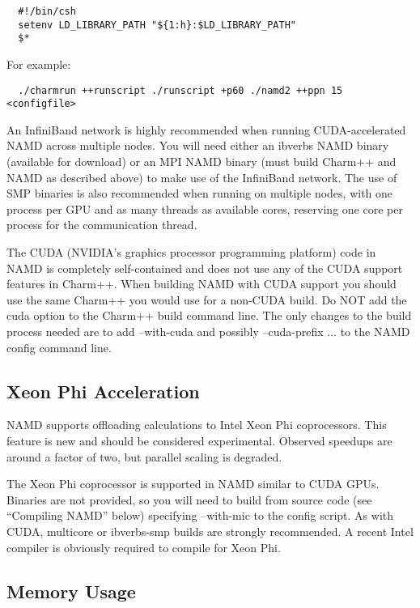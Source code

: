 \begin{verbatim}
  #!/bin/csh
  setenv LD_LIBRARY_PATH "${1:h}:$LD_LIBRARY_PATH"
  $*
\end{verbatim}

For example:

\begin{verbatim}
  ./charmrun ++runscript ./runscript +p60 ./namd2 ++ppn 15 <configfile>
\end{verbatim}

An InfiniBand network is highly recommended when running CUDA-accelerated
NAMD across multiple nodes.  You will need either an ibverbs NAMD binary
(available for download) or an MPI NAMD binary (must build Charm++ and
NAMD as described above) to make use of the InfiniBand network.  The use
of SMP binaries is also recommended when running on multiple nodes, with
one process per GPU and as many threads as available cores, reserving
one core per process for the communication thread.

The CUDA (NVIDIA's graphics processor programming platform) code in
NAMD is completely self-contained and does not use any of the CUDA
support features in Charm++.  When building NAMD with CUDA support
you should use the same Charm++ you would use for a non-CUDA build.
Do NOT add the cuda option to the Charm++ build command line.  The
only changes to the build process needed are to add --with-cuda and
possibly --cuda-prefix ... to the NAMD config command line.

\subsection{Xeon Phi Acceleration}

NAMD supports offloading calculations to Intel Xeon Phi coprocessors.
This feature is new and should be considered experimental.  Observed
speedups are around a factor of two, but parallel scaling is degraded.

The Xeon Phi coprocessor is supported in NAMD similar to CUDA GPUs.
Binaries are not provided, so you will need to build from source code
(see ``Compiling NAMD'' below) specifying --with-mic to the config script.
As with CUDA, multicore or ibverbs-smp builds are strongly recommended.
A recent Intel compiler is obviously required to compile for Xeon Phi.

\subsection{Memory Usage}

